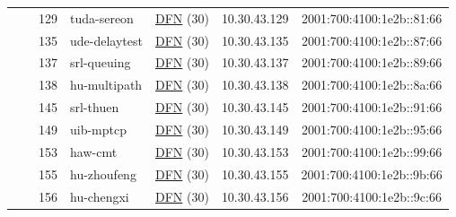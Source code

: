 \begin{small}
\begin{center}
\begin{longtable}{|c|c|c|c|c|c|c|c|}
  &  & \tiny{129} & \multicolumn{1}{|l|}{\tiny{tuda-sereon}} & \multicolumn{2}{|c|}{\tiny{\href{https://www.dfn.de}{DFN} (30)}} & \tiny{10.30.43.129} & \tiny{2001:700:4100:1e2b::81:66} \\* \cline{3-3}\cline{4-4}\cline{5-5}\cline{6-6}\cline{7-7}\cline{8-8}
  &  & \tiny{135} & \multicolumn{1}{|l|}{\tiny{ude-delaytest}} & \multicolumn{2}{|c|}{\tiny{\href{https://www.dfn.de}{DFN} (30)}} & \tiny{10.30.43.135} & \tiny{2001:700:4100:1e2b::87:66} \\* \cline{3-3}\cline{4-4}\cline{5-5}\cline{6-6}\cline{7-7}\cline{8-8}
  &  & \tiny{137} & \multicolumn{1}{|l|}{\tiny{srl-queuing}} & \multicolumn{2}{|c|}{\tiny{\href{https://www.dfn.de}{DFN} (30)}} & \tiny{10.30.43.137} & \tiny{2001:700:4100:1e2b::89:66} \\* \cline{3-3}\cline{4-4}\cline{5-5}\cline{6-6}\cline{7-7}\cline{8-8}
  &  & \tiny{138} & \multicolumn{1}{|l|}{\tiny{hu-multipath}} & \multicolumn{2}{|c|}{\tiny{\href{https://www.dfn.de}{DFN} (30)}} & \tiny{10.30.43.138} & \tiny{2001:700:4100:1e2b::8a:66} \\* \cline{3-3}\cline{4-4}\cline{5-5}\cline{6-6}\cline{7-7}\cline{8-8}
  &  & \tiny{145} & \multicolumn{1}{|l|}{\tiny{srl-thuen}} & \multicolumn{2}{|c|}{\tiny{\href{https://www.dfn.de}{DFN} (30)}} & \tiny{10.30.43.145} & \tiny{2001:700:4100:1e2b::91:66} \\* \cline{3-3}\cline{4-4}\cline{5-5}\cline{6-6}\cline{7-7}\cline{8-8}
  &  & \tiny{149} & \multicolumn{1}{|l|}{\tiny{uib-mptcp}} & \multicolumn{2}{|c|}{\tiny{\href{https://www.dfn.de}{DFN} (30)}} & \tiny{10.30.43.149} & \tiny{2001:700:4100:1e2b::95:66} \\* \cline{3-3}\cline{4-4}\cline{5-5}\cline{6-6}\cline{7-7}\cline{8-8}
  &  & \tiny{153} & \multicolumn{1}{|l|}{\tiny{haw-cmt}} & \multicolumn{2}{|c|}{\tiny{\href{https://www.dfn.de}{DFN} (30)}} & \tiny{10.30.43.153} & \tiny{2001:700:4100:1e2b::99:66} \\* \cline{3-3}\cline{4-4}\cline{5-5}\cline{6-6}\cline{7-7}\cline{8-8}
  &  & \tiny{155} & \multicolumn{1}{|l|}{\tiny{hu-zhoufeng}} & \multicolumn{2}{|c|}{\tiny{\href{https://www.dfn.de}{DFN} (30)}} & \tiny{10.30.43.155} & \tiny{2001:700:4100:1e2b::9b:66} \\* \cline{3-3}\cline{4-4}\cline{5-5}\cline{6-6}\cline{7-7}\cline{8-8}
  &  & \tiny{156} & \multicolumn{1}{|l|}{\tiny{hu-chengxi}} & \multicolumn{2}{|c|}{\tiny{\href{https://www.dfn.de}{DFN} (30)}} & \tiny{10.30.43.156} & \tiny{2001:700:4100:1e2b::9c:66} \\* \cline{3-3}\cline{4-4}\cline{5-5}\cline{6-6}\cline{7-7}\cline{8-8}

\end{longtable}
\end{center}
\end{small}

